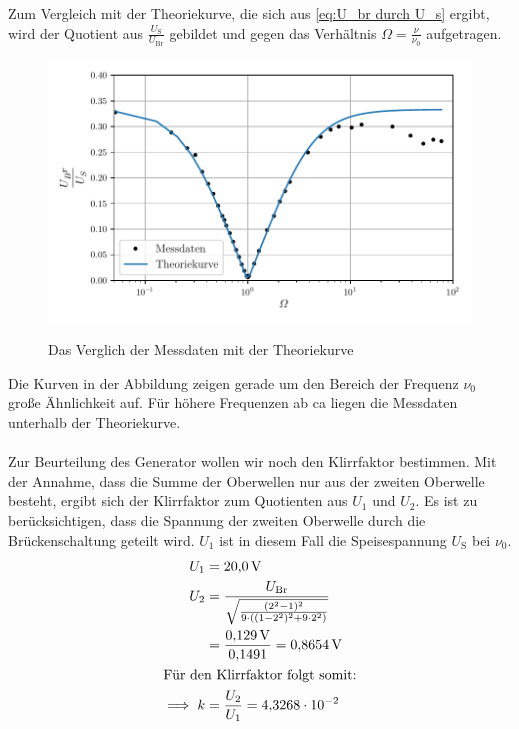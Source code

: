 Zum Vergleich mit der Theoriekurve, die sich aus \eqref{eq:U_br durch U_s}
ergibt, wird der Quotient aus $\frac{U_{\text{S}}}{U_{\text{Br}}}$ gebildet und gegen das Verhältnis $\Omega = \frac{\nu}{\nu_0}$ aufgetragen.\\
\begin{figure}
  \centering
  \caption{Das Verglich der Messdaten mit der Theoriekurve}
  \includegraphics[width = \textwidth]{plot.pdf}
  \label{fig:auswplot}
\end{figure}
Die Kurven in der Abbildung zeigen gerade um den Bereich der Frequenz $\nu_0$ große Ähnlichkeit auf.
Für höhere Frequenzen ab ca liegen die Messdaten unterhalb der Theoriekurve.\\
\\
Zur Beurteilung des Generator wollen wir noch den Klirrfaktor bestimmen.
Mit der Annahme, dass die Summe der Oberwellen nur aus der zweiten Oberwelle besteht, ergibt sich der Klirrfaktor zum Quotienten aus $U_1$ und $U_2$.
Es ist zu berücksichtigen, dass die Spannung der zweiten Oberwelle durch die Brückenschaltung geteilt wird.
$U_1$ ist in diesem Fall die Speisespannung $U_{\text{S}}$ bei $\nu_0$.
\begin{align*}
  U_1 &= \SI{20.0}{\volt}\\
  U_2 &= \frac{U_{\text{Br}}}{\sqrt{\frac{(2^2 -1)^2}{9\cdot ((1-2^2)^2 + 9\cdot 2^2)}}}\\
&= \frac{\SI{0.129}{\volt}}{\num{0.1491}} = \SI{0.8654}{\volt}\\
\intertext{Für den Klirrfaktor folgt somit:}
\implies k &= \frac{U_2}{U_1} = \num{4.3268e-2}
\end{align*}